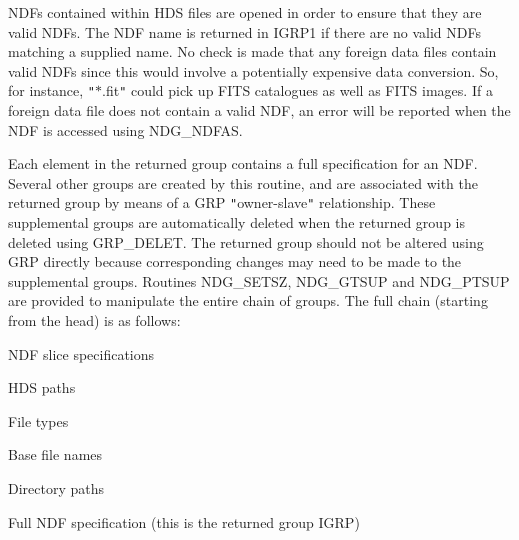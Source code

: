 {{{         \sstitem
         NDFs contained within HDS files are opened in order to ensure
         that they are valid NDFs. The NDF name is returned in IGRP1 if there
         are no valid NDFs matching a supplied name. No check is made that any
         foreign data files contain valid NDFs since this would involve a
         potentially expensive data conversion. So, for instance, {\tt "}$*$.fit{\tt "} could
         pick up FITS catalogues as well as FITS images. If a foreign data file
         does not contain a valid NDF, an error will be reported when the NDF
         is accessed using NDG\_NDFAS.

         \sstitem
         Each element in the returned group contains a full specification
         for an NDF. Several other groups are created by this routine, and
         are associated with the returned group by means of a GRP {\tt "}owner-slave{\tt "}
         relationship. These supplemental groups are automatically deleted
         when the returned group is deleted using GRP\_DELET. The returned
         group should not be altered using GRP directly because corresponding
         changes may need to be made to the supplemental groups. Routines
         NDG\_SETSZ, NDG\_GTSUP and NDG\_PTSUP are provided to manipulate the
         entire chain of groups. The full chain (starting from the head) is
         as follows:

         \sstitem
            NDF slice specifications

         \sstitem
            HDS paths

         \sstitem
            File types

         \sstitem
            Base file names

         \sstitem
            Directory paths

         \sstitem
            Full NDF specification (this is the returned group IGRP)
      }
   }
}
